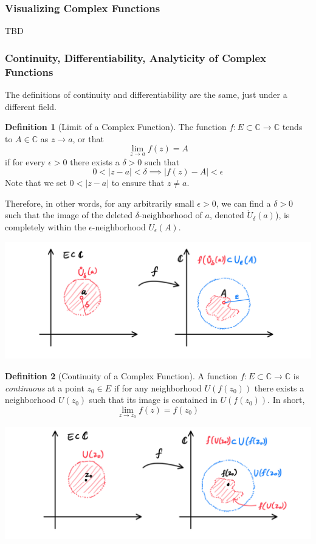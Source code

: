 \documentclass{article}
\theoremstyle{remark}
\theoremstyle{definition}
\newtheorem{definition}{Definition}[section]
\begin{document}
\subsubsection{Visualizing Complex Functions}

  TBD

\subsubsection{Continuity, Differentiability, Analyticity of Complex Functions}
The definitions of continuity and differentiability are the same, just under a different field. 

\begin{definition}[Limit of a Complex Function]
The function $f: E \subset \mathbb{C} \longrightarrow \mathbb{C}$ tends to $A \in \mathbb{C}$ as $z \rightarrow a$, or that
\[\lim_{z \rightarrow a} f(z) = A\]
if for every $\epsilon > 0$ there exists a $\delta > 0$ such that
\[0<|z - a|<\delta \implies |f(z) - A|<\epsilon\]
Note that we set $0<|z - a|$ to ensure that $z \neq a$. 

Therefore, in other words, for any arbitrarily small $\epsilon>0$, we can find a $\delta > 0$ such that the image of the deleted $\delta$-neighborhood of $a$, denoted $\mathring{U}_\delta (a)$), is completely within the $\epsilon$-neighborhood $U_\epsilon (A)$. 
\begin{center}
    \includegraphics[scale=0.3]{img/Limit_of_Complex_Function.PNG}
\end{center}
\end{definition}

\begin{definition}[Continuity of a Complex Function]
A function $f: E \subset \mathbb{C} \longrightarrow \mathbb{C}$ is \textit{continuous} at a point $z_0 \in E$ if for any neighborhood $U(f(z_0))$ there exists a neighborhood $U(z_0)$ such that its image is contained in $U(f(z_0))$. In short, 
\[\lim_{z \longrightarrow z_0} f(z) = f(z_0)\]
\begin{center}
  \includegraphics[scale=0.3]{img/Continuity_of_Complex_Function.PNG}
\end{center}
\end{definition}
\end{document}

